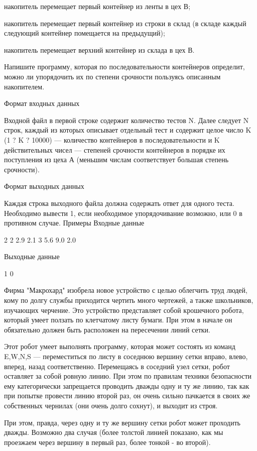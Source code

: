 \documentclass[]{article}
\begin{document}
накопитель перемещает первый контейнер из ленты в цех В;

накопитель перемещает первый контейнер из строки в склад (в складе каждый следующий контейнер помещается на предыдущий);

накопитель перемещает верхний контейнер из склада в цех В.

Напишите программу, которая по последовательности контейнеров определит, можно ли упорядочить их по степени срочности пользуясь описанным накопителем.

Формат входных данных

Входной файл в первой строке содержит количество тестов N. Далее следует N строк, каждый из которых описывает отдельный тест и содержит целое число K (1 ? K ? 10000) — количество контейнеров в последовательности и K действительных чисел — степеней срочности контейнеров в порядке их поступления из цеха А (меньшим числам соответствует большая степень срочности).

Формат выходных данных

Каждая строка выходного файла должна содержать ответ для одного теста. Необходимо вывести 1, если необходимое упорядочивание возможно, или 0 в противном случае.
Примеры
Входные данные

2
2 2.9 2.1
3 5.6 9.0 2.0

Выходные данные

1
0



Фирма "Макрохард" изобрела новое устройство с целью облегчить труд людей, кому по долгу службы приходится чертить много чертежей, а также школьников, изучающих черчение. Это устройство представляет собой крошечного робота, который умеет ползать по клетчатому листу бумаги. При этом в начале он обязательно должен быть расположен на пересечении линий сетки.

Этот робот умеет выполнять программу, которая может состоять из команд E,W,N,S — переместиться по листу в соседнюю вершину сетки вправо, влево, вперед, назад соответственно. Перемещаясь в соседний узел сетки, робот оставляет за собой ровную линию. При этом по правилам техники безопасности ему категорически запрещается проводить дважды одну и ту же линию, так как при попытке провести линию второй раз, он очень сильно пачкается в своих же собственных чернилах (они очень долго сохнут), и выходит из строя.

При этом, правда, через одну и ту же вершину сетки робот может проходить дважды. Возможно два случая (более толстой линией показано, как мы проезжаем через вершину в первый раз, более тонкой - во второй).
\end{document}
